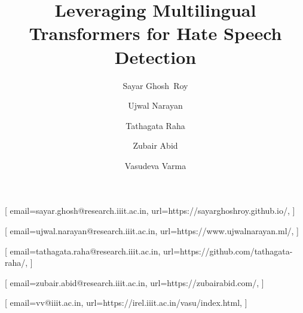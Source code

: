 \documentclass[
]{ceurart}
\begin{document}


\title{Leveraging Multilingual Transformers for Hate Speech Detection}

\author{Sayar Ghosh\ Roy}[%
email=sayar.ghosh@research.iiit.ac.in,
url=https://sayarghoshroy.github.io/,
]

\author{Ujwal Narayan}[%
email=ujwal.narayan@research.iiit.ac.in,
url=https://www.ujwalnarayan.ml/,
]

\author{Tathagata Raha}[%
email=tathagata.raha@research.iiit.ac.in,
url=https://github.com/tathagata-raha/,
]

\author{Zubair Abid}[%
email=zubair.abid@research.iiit.ac.in,
url=https://zubairabid.com/,
]

\author{Vasudeva Varma}[%
email=vv@iiit.ac.in,
url=https://irel.iiit.ac.in/vasu/index.html,
]
\end{document}
